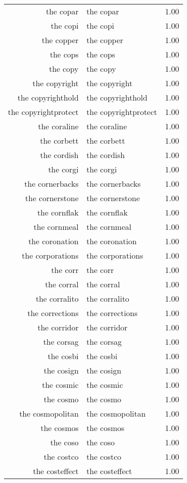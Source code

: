 \begin{table}[ht]
\begin{tabular}{rlr}
  the copar & the copar & 1.00 \\ 
  the copi & the copi & 1.00 \\ 
  the copper & the copper & 1.00 \\ 
  the cops & the cops & 1.00 \\ 
  the copy & the copy & 1.00 \\ 
  the copyright & the copyright & 1.00 \\ 
  the copyrighthold & the copyrighthold & 1.00 \\ 
  the copyrightprotect & the copyrightprotect & 1.00 \\ 
  the coraline & the coraline & 1.00 \\ 
  the corbett & the corbett & 1.00 \\ 
  the cordish & the cordish & 1.00 \\ 
  the corgi & the corgi & 1.00 \\ 
  the cornerbacks & the cornerbacks & 1.00 \\ 
  the cornerstone & the cornerstone & 1.00 \\ 
  the cornflak & the cornflak & 1.00 \\ 
  the cornmeal & the cornmeal & 1.00 \\ 
  the coronation & the coronation & 1.00 \\ 
  the corporations & the corporations & 1.00 \\ 
  the corr & the corr & 1.00 \\ 
  the corral & the corral & 1.00 \\ 
  the corralito & the corralito & 1.00 \\ 
  the corrections & the corrections & 1.00 \\ 
  the corridor & the corridor & 1.00 \\ 
  the corsag & the corsag & 1.00 \\ 
  the cosbi & the cosbi & 1.00 \\ 
  the cosign & the cosign & 1.00 \\ 
  the cosmic & the cosmic & 1.00 \\ 
  the cosmo & the cosmo & 1.00 \\ 
  the cosmopolitan & the cosmopolitan & 1.00 \\ 
  the cosmos & the cosmos & 1.00 \\ 
  the coso & the coso & 1.00 \\ 
  the costco & the costco & 1.00 \\ 
  the costeffect & the costeffect & 1.00 \\ 

\end{tabular}
\end{table}
